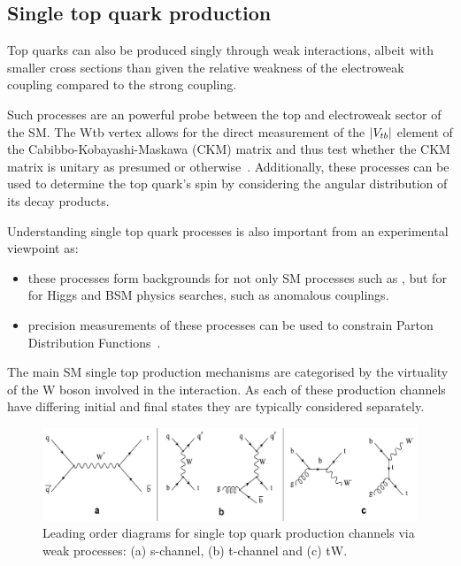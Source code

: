 \subsection{Single top quark production}\label{subsec:singleTopTheory}
Top quarks can also be produced singly through weak interactions, albeit with smaller cross sections than \ttbar given the relative weakness of the electroweak coupling compared to the strong coupling.

Such processes are an powerful probe between the top and electroweak sector of the SM.
The Wtb vertex allows for the direct measurement of the $\lvert V_{tb} \rvert$ element of the Cabibbo-Kobayashi-Maskawa (CKM) matrix and thus test whether the CKM matrix is unitary as presumed or otherwise~\cite{Shibata:2008sy}.
Additionally, these processes can be used to determine the top quark's spin by considering the angular distribution of its decay products.

Understanding single top quark processes is also important from an experimental viewpoint as:
\begin{itemize}
\item these processes form backgrounds for not only SM processes such as \ttbar, but for for Higgs and BSM physics searches, such as anomalous couplings.
\item precision measurements of these processes can be used to constrain Parton Distribution Functions~\cite{Guffanti:2010yu}.
\end{itemize}

The main SM single top production mechanisms are categorised by the virtuality of the W boson involved in the interaction.
As each of these production channels have differing initial and final states they are typically considered separately.

\begin{figure}[!h]
\centering
\includegraphics[width=1.00\textwidth]{figs/top-physics/singletop_feyn.jpg}
\caption{Leading order diagrams for single top quark production channels via weak processes: (a) s-channel, (b) t-channel and (c) tW.}
\label{fig:singleTopDiagrams}
\end{figure}

